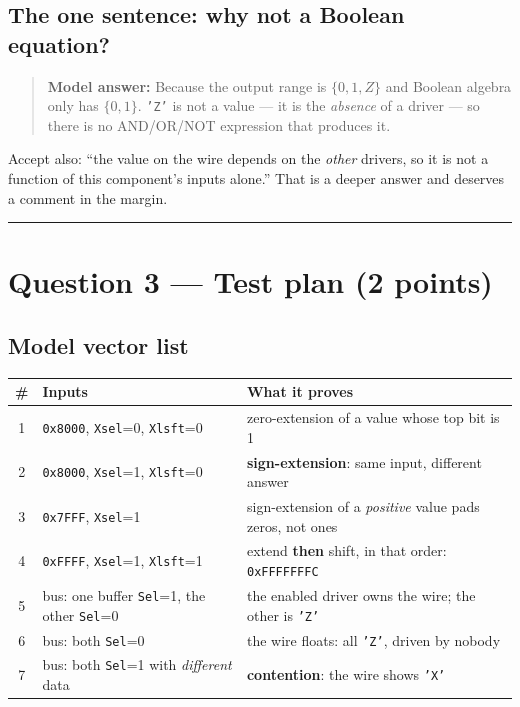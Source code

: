 \documentclass[11pt]{article}
\newcommand{\code}[1]{\texttt{#1}}
\newcommand{\hr}{\vspace{2pt}\hrule\vspace{6pt}}
\begin{document}
\subsection*{The one sentence: why not a Boolean equation?}

\begin{quote}
\textbf{Model answer:} Because the output range is $\{0, 1, Z\}$ and Boolean
algebra only has $\{0, 1\}$. \code{'Z'} is not a value --- it is the
\emph{absence} of a driver --- so there is no AND/OR/NOT expression that produces
it.
\end{quote}

Accept also: ``the value on the wire depends on the \emph{other} drivers, so it is
not a function of this component's inputs alone.'' That is a deeper answer and
deserves a comment in the margin.

\vspace{4pt}\hr

\section*{Question 3 --- Test plan (2 points)}

\subsection*{Model vector list}

\begin{center}
\small
\begin{tabular}{c>{\raggedright\arraybackslash}p{5.6cm}>{\raggedright\arraybackslash}p{7.0cm}}
\toprule
\# & Inputs & What it proves \\
\midrule
1 & \code{0x8000}, \code{Xsel}=0, \code{Xlsft}=0 & zero-extension of a value whose top bit is 1 \\
2 & \code{0x8000}, \code{Xsel}=1, \code{Xlsft}=0 & \textbf{sign-extension}: same input, different answer \\
3 & \code{0x7FFF}, \code{Xsel}=1 & sign-extension of a \emph{positive} value pads zeros, not ones \\
4 & \code{0xFFFF}, \code{Xsel}=1, \code{Xlsft}=1 & extend \textbf{then} shift, in that order: \code{0xFFFFFFFC} \\
5 & bus: one buffer \code{Sel}=1, the other \code{Sel}=0 & the enabled driver owns the wire; the other is \code{'Z'} \\
6 & bus: both \code{Sel}=0 & the wire floats: all \code{'Z'}, driven by nobody \\
7 & bus: both \code{Sel}=1 with \emph{different} data & \textbf{contention}: the wire shows \code{'X'} \\
\bottomrule
\end{tabular}
\end{center}
\end{document}
